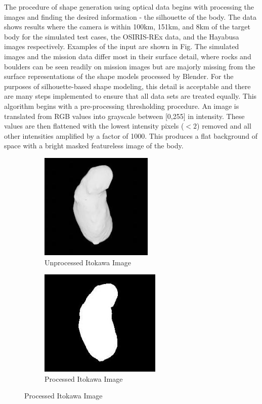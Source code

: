 The procedure of shape generation using optical data begins with processing the images and finding the desired information - the silhouette of the body. The data shows results where the camera is within 100km, 151km, and 8km of the target body for the simulated test cases, the OSIRIS-REx data, and the Hayabusa images respectively. Examples of the input are shown in Fig. %
The simulated images and the mission data differ most in their surface detail, where rocks and boulders can be seen readily on mission images but are majorly missing from the surface representations of the shape models processed by Blender. For the purposes of silhouette-based shape modeling, this detail is acceptable and there are many steps implemented to ensure that all data sets are treated equally. This algorithm begins with a pre-processing thresholding procedure. An image is translated from RGB values into grayscale between [0,255] in intensity. These values are then flattened with the lowest intensity pixels ($< 2$) removed and all other intensities amplified by a factor of 1000. This produces a flat background of space with a bright masked featureless image of the body. 
\begin{figure}[h!]
\begin{subfigure}{0.4\textwidth}
    \centering
    \includegraphics[width = \textwidth, height = 2in]{fig/unproc_ito.jpg}
    \caption{Unprocessed Itokawa Image}
\end{subfigure}
\hfill
\begin{subfigure}{0.4\textwidth}
    \centering
    \includegraphics[width = \textwidth, height = 2in]{fig/flat_thresh_ito.jpeg}
    \caption{Processed Itokawa Image}
\end{subfigure}
\end{figure}
